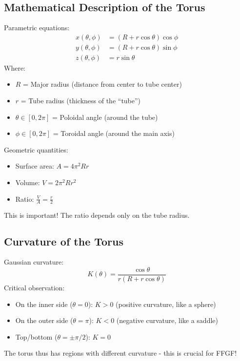 \documentclass[12pt,a4paper]{article}
\begin{document}
\subsection{Mathematical Description of the Torus}
Parametric equations:
\begin{align}
	x(\theta, \phi) &= (R + r \cos \theta) \cos \phi \\
	y(\theta, \phi) &= (R + r \cos \theta) \sin \phi \\
	z(\theta, \phi) &= r \sin \theta
\end{align}
Where:
\begin{itemize}
	\item \( R \) = Major radius (distance from center to tube center)
	\item \( r \) = Tube radius (thickness of the ``tube'')
	\item \( \theta \in [0, 2\pi] \) = Poloidal angle (around the tube)
	\item \( \phi \in [0, 2\pi] \) = Toroidal angle (around the main axis)
\end{itemize}

Geometric quantities:
\begin{itemize}
	\item Surface area: \( A = 4\pi^2 R r \)
	\item Volume: \( V = 2\pi^2 R r^2 \)
	\item Ratio: \( \frac{V}{A} = \frac{r}{2} \)
\end{itemize}
This is important! The ratio depends only on the tube radius.

\subsection{Curvature of the Torus}
Gaussian curvature:
\[
K(\theta) = \frac{\cos \theta}{r(R + r \cos \theta)}
\]
Critical observation:
\begin{itemize}
	\item On the inner side (\( \theta = 0 \)): \( K > 0 \) (positive curvature, like a sphere)
	\item On the outer side (\( \theta = \pi \)): \( K < 0 \) (negative curvature, like a saddle)
	\item Top/bottom (\( \theta = \pm\pi/2 \)): \( K = 0 \)
\end{itemize}
The torus thus has regions with different curvature - this is crucial for FFGF!
\end{document}
